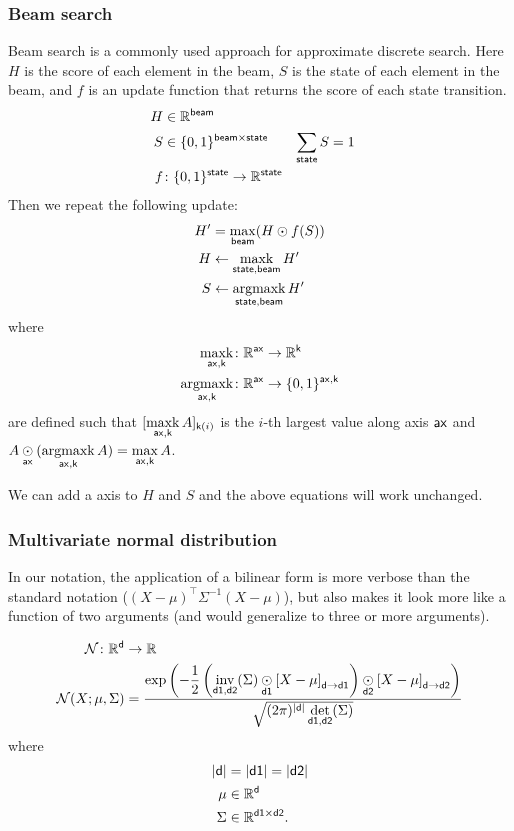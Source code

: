 \documentclass{article}
\newcommand{\reals}{\mathbb{R}}
\begin{document}
\subsubsection{Beam search}

Beam search is a commonly used approach for approximate discrete search. Here $H$ is the score of each element in the beam, $S$ is the state of each element in the beam, and $f$ is an update function that returns the score of each state transition. 
\begin{align*} 
H &\in \reals^{\name{beam}} \\
S &\in \{0, 1\}^{\name{beam} \times \name{state}} & \nsum{state} S &= 1 \\
f &\colon \{0, 1\}^{\name{state}} \rightarrow \reals^{\name{state}} \\
\end{align*}
Then we repeat the following update:
\begin{align*}
H' &= \mathop{\underset{\mathsf{beam}}{\mathrm{max}}} (H \odot f(S)) \\
H &\leftarrow \mathop{\underset{\mathsf{state,beam}}{\mathrm{maxk}}} H' \\
S &\leftarrow \mathop{\underset{\mathsf{state,beam}}{\mathrm{argmaxk}}} H'
\end{align*}
where
\begin{align*}
\nfun{ax,k}{maxk} \colon \reals^{\name{ax}} &\rightarrow \reals^{\name{k}} \\
\nfun{ax,k}{argmaxk} \colon \reals^{\name{ax}} &\rightarrow \{0,1\}^{\name{ax},\name{k}}
\end{align*}
are defined such that $[\mathop{\underset{\mathsf{ax,k}}{\mathrm{maxk}}} A]_{\mathsf{k}(i)}$ is the $i$-th largest value along axis $\mathsf{ax}$ and $A \mathbin{\underset{\mathsf{ax}}{\odot}} (\mathop{\underset{\mathsf{ax,k}}{\mathrm{argmaxk}}}{A}) = \mathop{\underset{\mathsf{ax,k}}{\mathrm{max}}} A$.

We can add a  axis to $H$ and $S$ and the above equations will work unchanged.

\subsubsection{Multivariate normal distribution}

In our notation, the application of a bilinear form is more verbose than the standard notation ($(X-\mu)^\top \Sigma^{-1} (X-\mu)$), but also makes it look more like a function of two arguments (and would generalize to three or more arguments).

\begin{align*}
\mathcal{N} \colon \reals^{\name{d}} &\rightarrow \reals \\
\mathcal{N}(X; \mu, \Sigma) &= \frac{\displaystyle \exp\left(-\frac{1}{2}  \left(\nfun{d1, d2}{inv}(\Sigma) \ndot{d1} \nmov{d}{d1}{X - \mu} \right) \ndot{d2} \nmov{d}{d2}{X - \mu} \right)}{\sqrt{(2 \pi)^{|\name{d}|} \nfun{d1, d2}{det}(\Sigma)}}
\end{align*}
where
\begin{align*}
|\name{d}| &= |\name{d1}| = |\name{d2}| \\
\mu &\in \reals^{\name{d}} \\
\Sigma & \in \reals^{\name{d1} \times \name{d2}}.
\end{align*}
\end{document}
